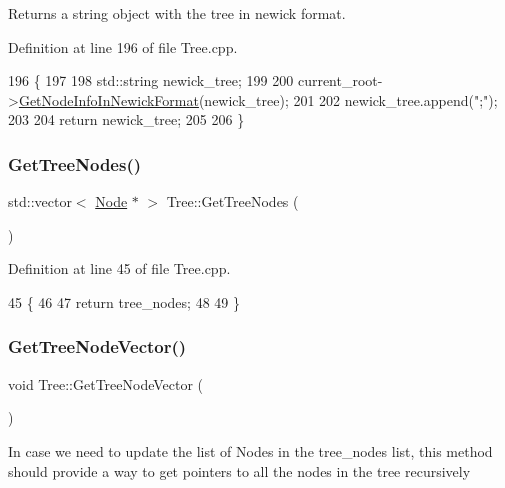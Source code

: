 \begin{DoxyReturn}{Returns}
a string object with the tree in newick format. 
\end{DoxyReturn}


Definition at line 196 of file Tree.\+cpp.


\begin{DoxyCode}
196                                      \{
197   
198   std::string newick\_tree;
199   
200   current\_root->\hyperlink{classNode_aa7c6c2500e38ecf478b9141188f1c840}{GetNodeInfoInNewickFormat}(newick\_tree);
201   
202   newick\_tree.append(\textcolor{stringliteral}{";"});
203   
204   \textcolor{keywordflow}{return} newick\_tree;
205   
206 \}
\end{DoxyCode}
\mbox{\label{classTree_a390ab7f66c8c33fe6780a372263d6d38}} 
\subsubsection{\texorpdfstring{Get\+Tree\+Nodes()}{GetTreeNodes()}}
{\footnotesize\ttfamily std\+::vector$<$ \hyperlink{classNode}{Node} $\ast$ $>$ Tree\+::\+Get\+Tree\+Nodes (\begin{DoxyParamCaption}{ }\end{DoxyParamCaption})}



Definition at line 45 of file Tree.\+cpp.


\begin{DoxyCode}
45                                    \{
46   
47   \textcolor{keywordflow}{return} tree\_nodes;
48   
49 \}
\end{DoxyCode}
\mbox{\label{classTree_aefee00842552e70746a5ed1fdca4f91f}} 
\subsubsection{\texorpdfstring{Get\+Tree\+Node\+Vector()}{GetTreeNodeVector()}}
{\footnotesize\ttfamily void Tree\+::\+Get\+Tree\+Node\+Vector (\begin{DoxyParamCaption}{ }\end{DoxyParamCaption})}

In case we need to update the list of Nodes in the tree\+\_\+nodes list, this method should provide a way to get pointers to all the nodes in the tree recursively 

